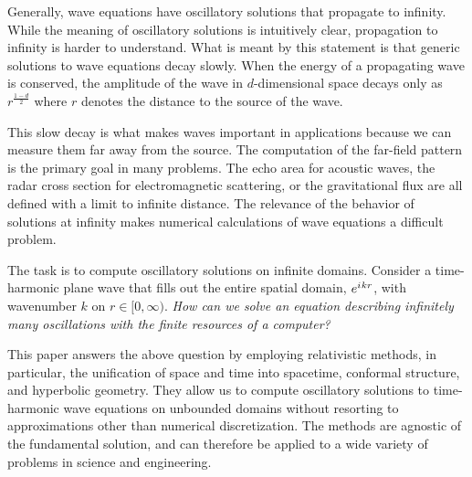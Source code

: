 \documentclass[draft,onefignum,onetabnum]{siamart190516}
\newcommand{\iu}{{i\mkern1mu}}
\begin{document}
Generally, wave equations have oscillatory solutions that propagate to infinity. While the meaning of oscillatory solutions is intuitively clear, propagation to infinity is harder to understand. What is meant by this statement is that generic solutions to wave equations decay slowly. When the energy of a propagating wave is conserved, the amplitude of the wave in $d$-dimensional space decays only as $r^{\frac{1-d}{2}}$ where $r$ denotes the distance to the source of the wave. 

This slow decay is what makes waves important in applications because we can measure them far away from the source. The computation of the far-field pattern is the primary goal in many problems. The echo area for acoustic waves, the radar cross section for electromagnetic scattering, or the gravitational flux are all defined with a limit to infinite distance. The relevance of the behavior of solutions at infinity makes numerical calculations of wave equations a difficult problem.

The task is to compute oscillatory solutions on infinite domains. Consider a time-harmonic plane wave that fills out the entire spatial domain, $e^{\iu k r}$, with wavenumber $k$ on $r\in[0,\infty)$. \emph{How can we solve an equation describing infinitely many oscillations with the finite resources of a computer?}

This paper answers the above question by employing relativistic methods, in particular, the unification of space and time into spacetime, conformal structure, and hyperbolic geometry. They allow us to compute oscillatory solutions to time-harmonic wave equations on unbounded domains without resorting to approximations other than numerical discretization. The methods are agnostic of the fundamental solution, and can therefore be applied to a wide variety of problems in science and engineering.

\end{document}
